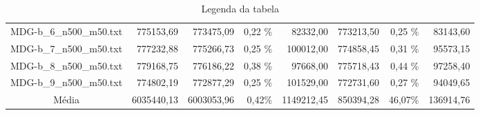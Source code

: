 \begin{landscape}
\begin{table}[ht]
\begin{tabular}{| c | r | r | r | r | r | r | r |  }
		MDG-b\_6\_n500\_m50.txt&775153,69&773475,09&0,22 \%&82332,00&773213,50&0,25 \%&83143,60\\
		MDG-b\_7\_n500\_m50.txt&777232,88&775266,73&0,25 \%&100012,00&774858,45&0,31 \%&95573,15\\
		MDG-b\_8\_n500\_m50.txt&779168,75&776186,22&0,38 \%&97668,00&775718,43&0,44 \%&97258,40\\
		MDG-b\_9\_n500\_m50.txt&774802,19&772877,29&0,25 \%&101529,00&772731,60&0,27 \%&94049,65\\
\hline 		Média&6035440,13&6003053,96&0,42\%&1149212,45&850394,28&46,07\%&136914,76\\ 
\hline
	\end{tabular}
	\caption{Legenda da tabela}
	\label{seu_label}
	\end{table}
\end{landscape}
